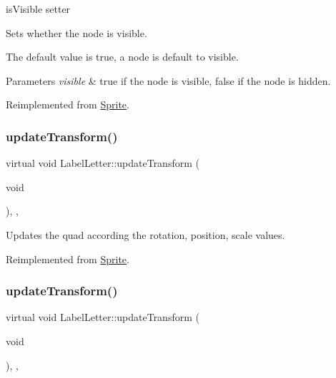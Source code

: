 is\+Visible setter 

Sets whether the node is visible.

The default value is true, a node is default to visible.


\begin{DoxyParams}{Parameters}
{\em visible} & true if the node is visible, false if the node is hidden. \\
\hline
\end{DoxyParams}


Reimplemented from \hyperlink{classSprite_abdaaa50259a13af3d6e8effded4ba42b}{Sprite}.

\mbox{\label{classLabelLetter_ae52821b1e8fb7782602524f23c23b3ac}} 
\subsubsection{\texorpdfstring{update\+Transform()}{updateTransform()}\hspace{0.1cm}{\footnotesize\ttfamily [1/2]}}
{\footnotesize\ttfamily virtual void Label\+Letter\+::update\+Transform (\begin{DoxyParamCaption}\item[{void}]{ }\end{DoxyParamCaption})\hspace{0.3cm}{\ttfamily [inline]}, {\ttfamily [override]}, {\ttfamily [virtual]}}

Updates the quad according the rotation, position, scale values. 

Reimplemented from \hyperlink{classSprite_a6b64d23ba646325021c2a5118dc5163d}{Sprite}.

\mbox{\label{classLabelLetter_ae52821b1e8fb7782602524f23c23b3ac}} 
\subsubsection{\texorpdfstring{update\+Transform()}{updateTransform()}\hspace{0.1cm}{\footnotesize\ttfamily [2/2]}}
{\footnotesize\ttfamily virtual void Label\+Letter\+::update\+Transform (\begin{DoxyParamCaption}\item[{void}]{ }\end{DoxyParamCaption})\hspace{0.3cm}{\ttfamily [inline]}, {\ttfamily [override]}, {\ttfamily [virtual]}}

